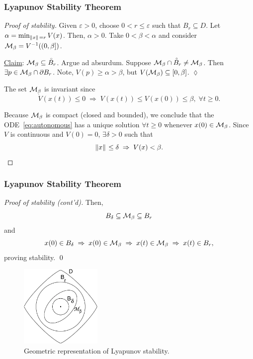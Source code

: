 \begin{frame}
    \frametitle{Lyapunov Stability Theorem}

    \begin{proof}[Proof of stability]
        Given $\varepsilon > 0$, choose $0 < r \leq \varepsilon$ such that $B_r
        \subseteq D$. Let $\alpha = \min_{\|{x}\|_{{}_{}}=r} V(x)$. Then, $\alpha >
        0$. Take $0 < \beta < \alpha$ and consider $\mathcal{M}_\beta = V^{-1}((0,
        \beta])$.

        \underline{Claim}: $\mathcal{M}_\beta \subseteq \accentset{\circ}{B}_r$.
        Argue ad absurdum. Suppose $\mathcal{M}_\beta \cap \accentset{\circ}{B}_r
        \neq \mathcal{M}_\beta$. Then $\exists p \in \mathcal{M}_\beta \cap \partial B_r$.
        Note, $V(p) \geq \alpha > \beta$, but $V(\mathcal{M}_\beta) \subseteq
        [0,\beta]$. \hfill $\lozenge$

        The set $\mathcal{M}_\beta$ is invariant since \[ \dot{V}(x(t)) \leq 0 \;
        \Rightarrow \; V(x(t)) \leq V(x(0)) \leq \beta, \; \forall t \geq 0. \]

        Because $\mathcal{M}_\beta$ is compact (closed and bounded), we conclude that
        the ODE~\eqref{eq:autonomous} has a unique solution $\forall t \geq 0$
        whenever $x(0) \in \mathcal{M}_\beta$. Since $V$ is continuous and $V(0) =
        0$, $\exists \delta > 0$ such that \[ \|{x}\|_{{}_{}} \leq \delta \;
        \Rightarrow \; V(x) < \beta. \]
    \end{proof}
\end{frame}

\begin{frame}
    \frametitle{Lyapunov Stability Theorem}

    \begin{proof}[Proof of stability (cont'd)]
        Then, \[ B_\delta \subseteq \mathcal{M}_\beta \subseteq B_r \] and 
        \[ x(0) \in B_\delta \; \Rightarrow \; x(0) \in \mathcal{M}_\beta \;
        \Rightarrow \; x(t) \in \mathcal{M}_\beta \; \Rightarrow \; x(t) \in B_r, \]
        proving stability. \hfill \qed
    \end{proof}

    \begin{figure}[bth]
        \centering
        \includegraphics[width=0.35\textwidth]{figures/lyap_geometry.eps} 
        \caption{\footnotesize Geometric representation of Lyapunov stability.}
    \end{figure}
\end{frame}

